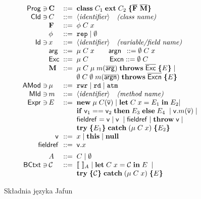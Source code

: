 \documentclass[]{pracamgr}
\renewcommand \| {\hspace{0.75em} | \hspace{0.75em} }
\renewcommand \[ {[\![}
\renewcommand \] {]\!]}
\theoremstyle{definition}
\newcommand{\ls}{\mathtt{rwr}\xspace}
\newcommand{\lenv}{\mathtt{rd}\xspace}
\newcommand{\bb}{\mathtt{atm}\xspace}
\newcommand{\mmod}{\mu\xspace}
\newcommand{\fmodifier}{\phi\xspace}
\newcommand{\argone}{\mathsf{arg}\xspace}
\newcommand{\argonen}{\mathsf{argn}\xspace}
\newcommand{\args}{\overline{\mathsf{arg}}\xspace}
\newcommand{\argns}{\overline{\mathsf{argn}}\xspace}
\newcommand{\Ex}{\mathsf{Exc}\xspace}
\newcommand{\Exn}{\mathsf{Excn}\xspace}
\newcommand{\Exc}{\overline{\mathsf{Exc}}\xspace}
\newcommand{\Excn}{\overline{\mathsf{Excn}}\xspace}
\newcommand{\fieldref}{\mathsf{fieldref}\xspace}
\newcommand{\varref}{\mathsf{v}\xspace}
\newcommand{\varrefs}{\overline{\varref}}
\newcommand{\jclass}{\mathbf{class}\xspace}
\newcommand{\jext}{\mathbf{ext}\xspace}
\newcommand{\reg}{\emptyset}
\newcommand{\rep}{\mathtt{rep}\xspace}
\newcommand{\throws}{\mathbf{throws}\xspace}
\newcommand{\jlet}{\mathbf{let}\xspace}
\newcommand{\jin}{\mathbf{in}\xspace}
\newcommand{\jif}{\mathbf{if}\xspace}
\newcommand{\jthen}{\mathbf{then}\xspace}
\newcommand{\jelse}{\mathbf{else}\xspace}
\newcommand{\jthrow}{\mathbf{throw}\xspace}
\newcommand{\jtry}{\mathbf{try}\xspace}
\newcommand{\jcatch}{\mathbf{catch}\xspace}
\newcommand{\jnull}{\mathbf{null}\xspace}
\newcommand{\jnew}{\mathbf{new}\xspace}
\newcommand{\jthis}{\textbf{this}\xspace}
\newcommand{\letin}[4]{\jlet\; #1\; #2 = #3\; \jin\; #4\xspace}
\newcommand{\ite}[3]{\jif\; #1\; \jthen\; #2\; \jelse\; #3\xspace}
\newcommand{\newin}[3]{\jnew\; #1\; #2(#3)\xspace}
\newcommand{\throwin}[1]{\jthrow\; #1\xspace}
\newcommand{\tcatch}[4]{\jtry\; \boldsymbol{\{}#1\boldsymbol{\}}\; \jcatch\; (#2\; #3)\; \boldsymbol{\{}#4\boldsymbol{\}}\xspace}
\newcommand{\Cname}{\mathsf{CId}\xspace}
\newcommand{\Lannot}{\mathsf{AMod}\xspace}
\newcommand{\Ident}{\mathsf{Id}\xspace}
\newcommand{\MIdent}{\mathsf{MId}\xspace}
\newcommand{\Expr}{\mathsf{Expr}\xspace}
\newcommand{\BCtxt}{\mathsf{BCtxt}\xspace}
\newcommand{\ctxt}{\mathcal{C}\xspace}
\newcommand{\Prog}{\mathsf{Prog}\xspace}
\begin{document}
\begin{figure}[h]
$$
 \begin{array}{@{}r@{\,}l@{\;\;}c@{\;\;}l@{}}
    \Prog\owns
    & \mathbf{C}          & ::= & \jclass\;
                       C_1\; \jext\; C_2\; \boldsymbol\{ \overline{\mathbf{F}}~ \overline{\mathbf{M}} \boldsymbol\}\\
    \Cname\owns
    & C          & ::= & \langle \textit{identifier}\rangle \quad\textit{(class name)}\\
    & \mathbf{F}         & ::= & \fmodifier\; C\; x\\
    & \fmodifier & ::= & \rep\;|\; \reg \\
    \Ident\owns
    & x          & ::= & \langle \textit{identifier}\rangle \quad\textit{(variable/field name)}\\
    & \argone    & ::= & \mmod\; C\; x \qquad
      \argonen   ~\, ::=  \reg\; C\; x\\
    & \Ex        & ::= & \mmod\; C\qquad\quad
      \Exn        ::=  \reg\; C\\
    & \mathbf{M}         & ::= & \mmod\; C\; \mmod\; m(\args)\; \throws\; \Exc\;
                         \boldsymbol{\{}E\boldsymbol{\}}\;|\; \\
    &            &     & \reg\; C\; \reg\; m(\argns)\; \throws\; \Excn\; \boldsymbol{\{}E\boldsymbol{\}}\; \\
    \Lannot\owns
    & \mmod & ::= & \ls\;|\; \lenv\;|\; \bb\\
    \MIdent\owns
    & m          & ::= & \langle \textit{identifier}\rangle \quad\textit{(method name)}\\
    \Expr\owns 
    & E          & ::= & \newin{\mmod}{C}{\varrefs}\;|\; \letin{C}{x}{E_1}{E_2} |\\
    &            &     & \ite{\varref_1 == \varref_2}{E_3}{E_4}\;\;|\;                          \varref.m( \varrefs)\;|\; \\
    &            &     & \fieldref = \varref\;|\; 
                         \varref\;\;|\;                          \fieldref\;|\;                          \throwin{\varref}\;|\; \\
    &            &     & \tcatch{E_1}{\mmod\; C}{x}{E_2} \\
    \multicolumn{2}{r}{\varref\,}    & ::= & x\;|\; \jthis\;|\; \jnull \\
    \multicolumn{2}{r}{\fieldref\,}  & ::= & \varref.x 
    \\[1ex]                                         
      & A      & ::= & C\;|\; \emptyset\\
    \BCtxt\owns
      & \ctxt     & ::= &
                     \[ ~\] _A\;|\; \letin{C}{x}{\ctxt}{E}\;\;|\; \\
      &        &     &   \tcatch{\ctxt}{\mmod\; C}{x}{E}
  \end{array}
$$
\caption{Składnia języka Jafun}
\label{fig:jafun_syntax}
\end{figure}
\end{document}
